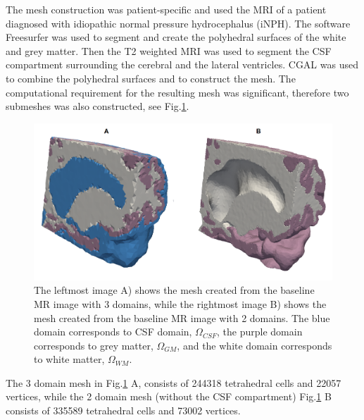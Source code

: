 \documentclass[11pt,a4paper]{article}
\newcommand{\lars}[1]{\textcolor{magenta}{#1}}
\begin{document}
The mesh construction was patient-specific and used the MRI of a patient diagnosed with idiopathic normal pressure hydrocephalus (iNPH). The software Freesurfer was used to segment and create the polyhedral surfaces of the white and grey matter. Then the T2 weighted MRI \cite{eidevalnes} was used to segment the CSF compartment surrounding the cerebral and the lateral ventricles. CGAL \cite{cgal:rty-m3-18b} was used to combine the polyhedral surfaces and to construct the mesh. The computational requirement for the resulting mesh was significant, therefore two submeshes was also constructed, see Fig.\ref{Fig::Mesh}.
\begin{figure}
\centering
\includegraphics[scale=0.2]{mesh.png} 
\caption{The leftmost image A) shows the mesh created from the baseline MR image with 3 domains, while the rightmost image  B) shows the mesh created from the baseline MR image with 2 domains. The blue domain corresponds to CSF domain, $\Omega_{CSF}$, the purple domain corresponds to grey matter,  $\Omega_{GM}$, and the white domain corresponds to white matter, $\Omega_{WM}$. }
\label{Fig::Mesh}
\end{figure}
The 3 domain mesh in Fig.\ref{Fig::Mesh} A, consists of 244318 tetrahedral cells and 22057 vertices, while the 2 domain mesh (without the CSF compartment) Fig.\ref{Fig::Mesh} B consists of 335589 tetrahedral cells and 73002 vertices. 
\end{document}
